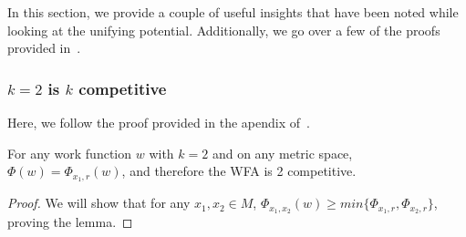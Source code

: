 In this section, we provide a couple of useful insights that have been noted while looking at the unifying potential. Additionally, we go over a few of the proofs provided in~\cite{unifyingPotential2021}. 

\subsubsection*{$k=2$ is $k$ competitive}

Here, we follow the proof provided in the apendix of~\cite{unifyingPotential2021}.

\begin{lemma}
    For any work function $w$ with $k = 2$ and on any metric space, $\Phi(w) = \Phi_{x_1, r} (w)$, and therefore the WFA is 2 competitive.
\end{lemma}

\begin{proof}
    We will show that for any $x_1, x_2 \in M$, $\Phi_{x_1, x_2} (w) \geq min\{ \Phi_{x_1, r}, \Phi_{x_2, r}\}$, proving the lemma.
\end{proof}